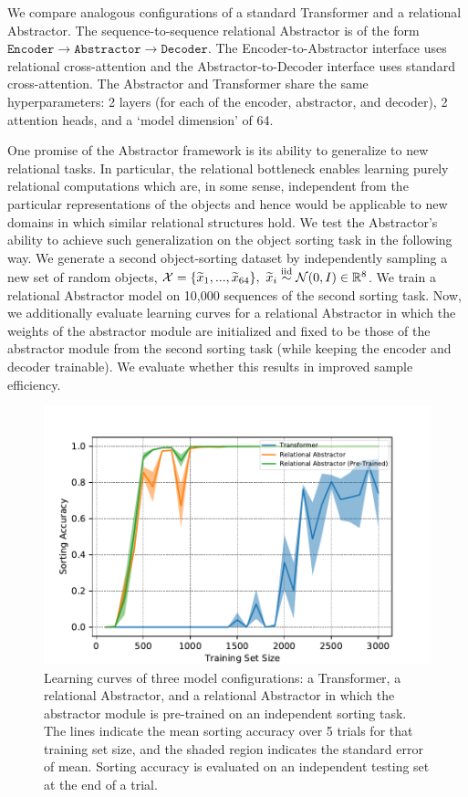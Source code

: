  We compare analogous configurations of a standard Transformer and a relational Abstractor. The sequence-to-sequence relational Abstractor is of the form $\texttt{Encoder} \to \texttt{Abstractor} \to \texttt{Decoder}$. The Encoder-to-Abstractor interface uses relational cross-attention and the Abstractor-to-Decoder interface uses standard cross-attention. The Abstractor and Transformer share the same hyperparameters: 2 layers (for each of the encoder, abstractor, and decoder), 2 attention heads, and a `model dimension' of 64.

 One promise of the Abstractor framework is its ability to generalize to new relational tasks. In particular, the relational bottleneck enables learning purely relational computations which are, in some sense, independent from the particular representations of the objects and hence would be applicable to new domains in which similar relational structures hold. We test the Abstractor's ability to achieve such generalization on the object sorting task in the following way. We generate a second object-sorting dataset by independently sampling a new set of random objects, $\mathcal{X} = \{ \widetilde{x}_1 , ..., \widetilde{x}_{64} \}, \ \widetilde{x}_i \overset{\mathrm{iid}}{\sim} \mathcal{N}(0, I) \in \mathbb{R}^8$. We train a relational Abstractor model on 10,000 sequences of the second sorting task. Now, we additionally evaluate learning curves for a relational Abstractor in which the weights of the abstractor module are initialized and fixed to be those of the abstractor module from the second sorting task (while keeping the encoder and decoder trainable). We evaluate whether this results in improved sample efficiency.

\begin{figure}[t!]
	\centering
	\includegraphics[width=.8\textwidth]{figures/random_object_argsort_learning_curves.pdf}
	\caption{Learning curves of three model configurations: a Transformer, a relational Abstractor, and a relational Abstractor in which the abstractor module is pre-trained on an independent sorting task. The lines indicate the mean sorting accuracy over 5 trials for that training set size, and the shaded region indicates the standard error of mean. Sorting accuracy is evaluated on an independent testing set at the end of a trial.}
	\label{fig:random_object_argsort_learning_curves}
\end{figure}


